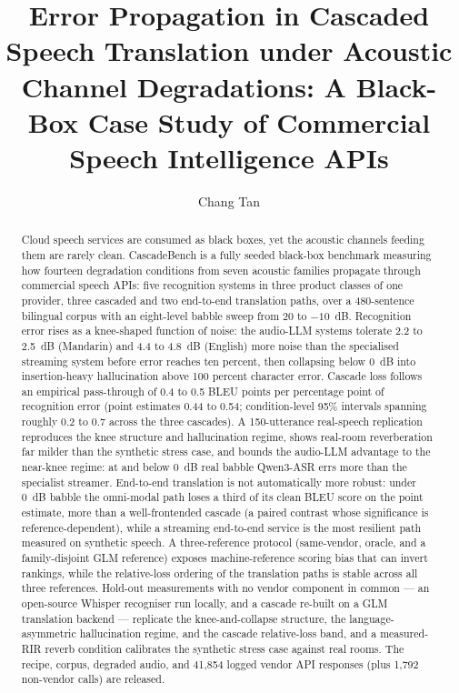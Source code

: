\documentclass[review,number,sort&compress]{elsarticle}
\begin{document}
\begin{frontmatter}

\title{Error Propagation in Cascaded Speech Translation under Acoustic Channel
Degradations: A Black-Box Case Study of Commercial Speech Intelligence APIs}

\author[addr1]{Chang Tan}
\address[addr1]{Dalian University of Technology, Dalian 116024, China}

\begin{abstract}
Cloud speech services are consumed as black boxes, yet the acoustic channels
feeding them are rarely clean. CascadeBench is a fully seeded black-box
benchmark measuring how fourteen degradation conditions from seven acoustic
families propagate through commercial speech APIs: five recognition systems
in three product classes of one provider, three cascaded and two end-to-end
translation paths, over a 480-sentence bilingual corpus with an eight-level babble
sweep from 20 to $-10$~dB. Recognition error rises
as a knee-shaped function of noise: the audio-LLM systems tolerate 2.2 to
2.5~dB (Mandarin) and 4.4 to 4.8~dB (English) more noise than the
specialised streaming system before error reaches ten percent, then
collapsing below 0~dB into insertion-heavy hallucination above 100
percent character error. Cascade loss follows an empirical pass-through of
0.4 to 0.5
BLEU points per percentage point of recognition error (point estimates
0.44 to 0.54; condition-level 95\% intervals spanning roughly 0.2 to 0.7
across the three cascades). A 150-utterance real-speech replication reproduces the knee
structure and hallucination regime, shows real-room reverberation far milder than the synthetic
stress case, and bounds the audio-LLM advantage to the near-knee regime:
at and below 0~dB real babble Qwen3-ASR errs more than the specialist
streamer. End-to-end translation is not automatically more robust: under
0~dB babble the omni-modal path loses a third of its clean BLEU score on
the point estimate, more than a well-frontended cascade (a paired
contrast whose significance is reference-dependent), while a streaming
end-to-end service is the most resilient path measured on synthetic
speech. A three-reference protocol (same-vendor, oracle, and a
family-disjoint GLM reference) exposes machine-reference scoring bias that
can invert rankings, while the relative-loss ordering of the translation
paths is stable across all three references. Hold-out measurements with
no vendor component in common --- an open-source Whisper recogniser run
locally, and a cascade re-built on a GLM translation backend --- replicate
the knee-and-collapse structure, the language-asymmetric hallucination
regime, and the cascade relative-loss band, and a measured-RIR reverb
condition calibrates the synthetic stress case against real rooms. The
recipe, corpus, degraded audio, and 41{,}854 logged vendor API responses
(plus 1{,}792 non-vendor calls) are released.
\end{abstract}


\end{frontmatter}
\end{document}
